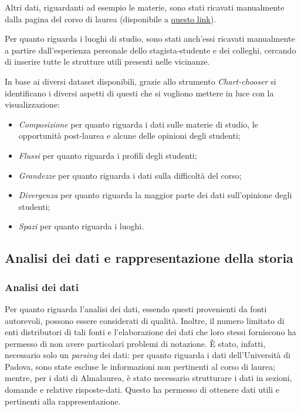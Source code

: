 Altri dati, riguardanti ad esempio le materie, sono stati ricavati manualmente dalla pagina del corso di laurea (disponibile a \href{https://www.didattica.unipd.it/off/2023/LT/SC/SC1167}{questo link}).

Per quanto riguarda i luoghi di studio, sono stati anch'essi ricavati manualmente a partire dall'esperienza personale dello stagista-studente e dei colleghi, cercando di inserire tutte le strutture utili presenti nelle vicinanze.

\bigskip
\noindent In base ai diversi dataset disponibili, grazie allo strumento \emph{Chart-chooser} si identificano i diversi aspetti di questi che si vogliono mettere in luce con la visualizzazione:
\begin{itemize}
    \item \emph{Composizione} per quanto riguarda i dati sulle materie di studio, le opportunità post-laurea e alcune delle opinioni degli studenti;
    \item \emph{Flussi} per quanto riguarda i profili degli studenti;
    \item \emph{Grandezze} per quanto riguarda i dati sulla difficoltà del corso;
    \item \emph{Divergenza} per quanto riguarda la maggior parte dei dati sull'opinione degli studenti;
    \item \emph{Spazi} per quanto riguarda i luoghi.
\end{itemize}

\subsection{Analisi dei dati e rappresentazione della storia}
\subsubsection{Analisi dei dati}
Per quanto riguarda l'analisi dei dati, essendo questi provenienti da fonti autorevoli, possono essere considerati di qualità. Inoltre, il numero limitato di enti distributori di tali fonti e l'elaborazione 
dei dati che loro stessi forniscono ha permesso di non avere particolari problemi di notazione. 
È stato, infatti, necessario solo un \emph{parsing} dei dati: per quanto riguarda i dati dell'Università di Padova, sono state escluse le informazioni non pertinenti al corso di laurea;
mentre, per i dati di Almalaurea, è stato necessario strutturare i dati in sezioni, domande e relative risposte-dati. 
Questo ha permesso di ottenere dati utili e pertinenti alla rappresentazione.

